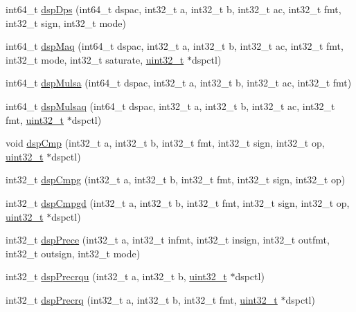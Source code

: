 \begin{DoxyCompactItemize}
\item 
int64\_\-t \hyperlink{namespaceMipsISA_a1a929f7695ad8008ac3ccb032cdcdd6b}{dspDps} (int64\_\-t dspac, int32\_\-t a, int32\_\-t b, int32\_\-t ac, int32\_\-t fmt, int32\_\-t sign, int32\_\-t mode)
\item 
int64\_\-t \hyperlink{namespaceMipsISA_a6279e65f0daf37eafa4bbd108beb11a6}{dspMaq} (int64\_\-t dspac, int32\_\-t a, int32\_\-t b, int32\_\-t ac, int32\_\-t fmt, int32\_\-t mode, int32\_\-t saturate, \hyperlink{Type_8hh_a435d1572bf3f880d55459d9805097f62}{uint32\_\-t} $\ast$dspctl)
\item 
int64\_\-t \hyperlink{namespaceMipsISA_a5ee886f543d611b1ed90edbab6ed65ea}{dspMulsa} (int64\_\-t dspac, int32\_\-t a, int32\_\-t b, int32\_\-t ac, int32\_\-t fmt)
\item 
int64\_\-t \hyperlink{namespaceMipsISA_a4cc04259ad0dee2a8f51aeafd6f86e92}{dspMulsaq} (int64\_\-t dspac, int32\_\-t a, int32\_\-t b, int32\_\-t ac, int32\_\-t fmt, \hyperlink{Type_8hh_a435d1572bf3f880d55459d9805097f62}{uint32\_\-t} $\ast$dspctl)
\item 
void \hyperlink{namespaceMipsISA_abbbcf8d18bd1b22f7507e7485fbdac5a}{dspCmp} (int32\_\-t a, int32\_\-t b, int32\_\-t fmt, int32\_\-t sign, int32\_\-t op, \hyperlink{Type_8hh_a435d1572bf3f880d55459d9805097f62}{uint32\_\-t} $\ast$dspctl)
\item 
int32\_\-t \hyperlink{namespaceMipsISA_a295d7a6bdde8c31aff5fa704fd0b076b}{dspCmpg} (int32\_\-t a, int32\_\-t b, int32\_\-t fmt, int32\_\-t sign, int32\_\-t op)
\item 
int32\_\-t \hyperlink{namespaceMipsISA_a67fa3d39788e580417830ada4e00b885}{dspCmpgd} (int32\_\-t a, int32\_\-t b, int32\_\-t fmt, int32\_\-t sign, int32\_\-t op, \hyperlink{Type_8hh_a435d1572bf3f880d55459d9805097f62}{uint32\_\-t} $\ast$dspctl)
\item 
int32\_\-t \hyperlink{namespaceMipsISA_ac12488f8197cbefee846aecd70428c5c}{dspPrece} (int32\_\-t a, int32\_\-t infmt, int32\_\-t insign, int32\_\-t outfmt, int32\_\-t outsign, int32\_\-t mode)
\item 
int32\_\-t \hyperlink{namespaceMipsISA_a9f4e496d59bfdc8529c9d569723a1d30}{dspPrecrqu} (int32\_\-t a, int32\_\-t b, \hyperlink{Type_8hh_a435d1572bf3f880d55459d9805097f62}{uint32\_\-t} $\ast$dspctl)
\item 
int32\_\-t \hyperlink{namespaceMipsISA_ae9f8befb1c44a3f87e10ef57ff3cd94f}{dspPrecrq} (int32\_\-t a, int32\_\-t b, int32\_\-t fmt, \hyperlink{Type_8hh_a435d1572bf3f880d55459d9805097f62}{uint32\_\-t} $\ast$dspctl)
\item 

\end{DoxyCompactItemize}
